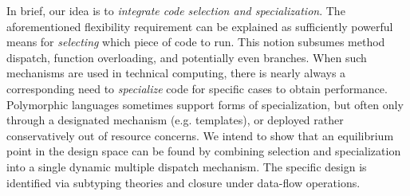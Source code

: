 In brief, our idea is to \emph{integrate code selection and specialization}.
The aforementioned flexibility requirement can be explained as
sufficiently powerful means for \emph{selecting} which piece of code
to run. This notion subsumes method dispatch, function overloading,
and potentially even branches. When such mechanisms are used in
technical computing, there is nearly always a corresponding need to
\emph{specialize} code for specific cases to obtain performance.
Polymorphic languages sometimes support forms of specialization,
but often only through a designated mechanism (e.g. templates), or
deployed rather conservatively out of resource concerns.
We intend to show that an equilibrium point in the design
space can be found by combining selection and specialization
into a single dynamic multiple dispatch mechanism.
The specific design is identified via
subtyping theories and closure under data-flow operations.













